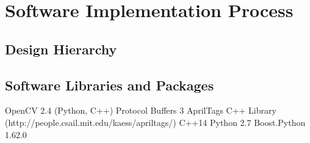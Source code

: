 
\section{Software Implementation Process}
\label{sec:software_implementation}

\subsection{Design Hierarchy}
\label{sec:software_design}

\subsection{Software Libraries and Packages}
\label{sec:software_libraries}
OpenCV 2.4 (Python, C++)
Protocol Buffers 3 \cite{protobuf3}
AprilTags C++ Library (http://people.csail.mit.edu/kaess/apriltags/)
C++14
Python 2.7
Boost.Python 1.62.0










